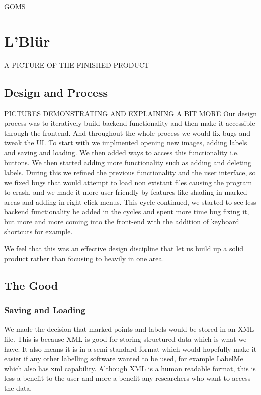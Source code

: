 \documentclass[a4paper,11pt,oneside]{article}
\begin{document}
GOMS

\section{L'Bl\"{u}r}
A PICTURE OF THE FINISHED PRODUCT

\subsection{Design and Process}
PICTURES DEMONSTRATING AND EXPLAINING A BIT MORE
Our design process was to iteratively build backend functionality and then make
it accessible through the frontend.  And throughout the whole process we would
fix bugs and tweak the UI.  To start with we implmented opening new images,
adding labels and saving and loading.  We then added ways to access this
functionality i.e. buttons.  We then started adding more functionality such as
adding and deleting labels.  During this we refined the previous functionality
and the user interface, so we fixed bugs that would attempt to load non existant
files causing the program to crash, and we made it more user friendly by
features like shading in marked areas and adding in right click menus.  This
cycle continued, we started to see less backend functionality be added in the
cycles and spent more time bug fixing it, but more and more coming into the
front-end with the addition of keyboard shortcuts for example.

We feel that this was an effective design discipline that let us build up a
solid product rather than focusing to heavily in one area.

\subsection{The Good}

\subsubsection{Saving and Loading}
We made the decision that marked points and labels would be stored in an XML
file.  This is because XML is good for storing structured data which is what we
have.  It also means it is in a semi standard format which would hopefully make
it easier if any other labelling software wanted to be used, for example LabelMe
which also has xml capability.  Although XML is a human readable format, this is
less a benefit to the user and more a benefit any researchers who want to access
the data.
\end{document}
